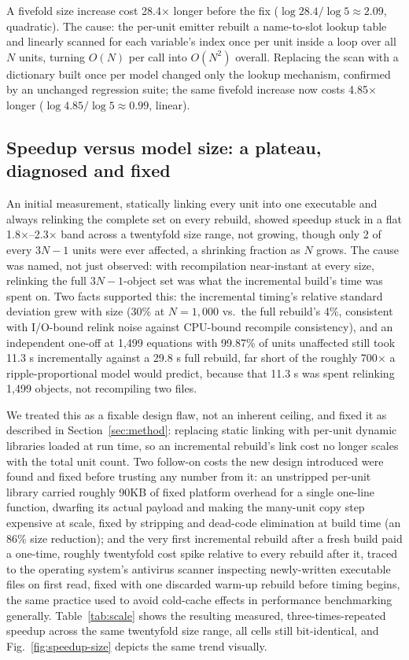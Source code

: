 \documentclass[journal]{IEEEtran}
\begin{document}
A fivefold size increase cost 28.4$\times$ longer before the fix ($\log 28.4/\log 5 \approx 2.09$, quadratic). The cause: the per-unit emitter rebuilt a name-to-slot lookup table and linearly scanned for each variable's index once per unit inside a loop over all $N$ units, turning $O(N)$ per call into $O(N^2)$ overall. Replacing the scan with a dictionary built once per model changed only the lookup mechanism, confirmed by an unchanged regression suite; the same fivefold increase now costs 4.85$\times$ longer ($\log 4.85/\log 5 \approx 0.99$, linear).

\subsection{Speedup versus model size: a plateau, diagnosed and fixed}
\label{sec:scale-results}

An initial measurement, statically linking every unit into one executable and always relinking the complete set on every rebuild, showed speedup stuck in a flat 1.8$\times$--2.3$\times$ band across a twentyfold size range, not growing, though only 2 of every $3N{-}1$ units were ever affected, a shrinking fraction as $N$ grows. The cause was named, not just observed: with recompilation near-instant at every size, relinking the full $3N{-}1$-object set was what the incremental build's time was spent on. Two facts supported this: the incremental timing's relative standard deviation grew with size (30\% at $N{=}1{,}000$ vs.\ the full rebuild's 4\%, consistent with I/O-bound relink noise against CPU-bound recompile consistency), and an independent one-off at 1,499 equations with 99.87\% of units unaffected still took 11.3 s incrementally against a 29.8 s full rebuild, far short of the roughly 700$\times$ a ripple-proportional model would predict, because that 11.3 s was spent relinking 1,499 objects, not recompiling two files.

We treated this as a fixable design flaw, not an inherent ceiling, and fixed it as described in Section~\ref{sec:method}: replacing static linking with per-unit dynamic libraries loaded at run time, so an incremental rebuild's link cost no longer scales with the total unit count. Two follow-on costs the new design introduced were found and fixed before trusting any number from it: an unstripped per-unit library carried roughly 90KB of fixed platform overhead for a single one-line function, dwarfing its actual payload and making the many-unit copy step expensive at scale, fixed by stripping and dead-code elimination at build time (an 86\% size reduction); and the very first incremental rebuild after a fresh build paid a one-time, roughly twentyfold cost spike relative to every rebuild after it, traced to the operating system's antivirus scanner inspecting newly-written executable files on first read, fixed with one discarded warm-up rebuild before timing begins, the same practice used to avoid cold-cache effects in performance benchmarking generally. Table~\ref{tab:scale} shows the resulting measured, three-times-repeated speedup across the same twentyfold size range, all cells still bit-identical, and Fig.~\ref{fig:speedup-size} depicts the same trend visually.
\end{document}

